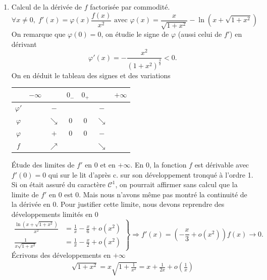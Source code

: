 \begin{enumerate}
\begin{enumerate}
  \item Calcul de la dérivée de $f$ factorisée par commodité.
\begin{displaymath}
\forall x\neq 0,\; f'(x) = \varphi(x) \frac{f(x)}{x^2} \text{ avec } 
\varphi(x) = \frac{x}{\sqrt{1+x^2}} - \ln\left( x+\sqrt{1+x^2}\right)   
\end{displaymath}
On remarque que $\varphi(0)=0$, on étudie le signe de $\varphi$ (aussi celui de $f'$) en dérivant
\begin{displaymath}
  \varphi'(x) = -\frac{x^2}{(1+x^2)^{\frac{3}{2}}} < 0 .
\end{displaymath}
On en déduit le tableau des signes et des variations
\begin{center}
\begin{tabular}{c|ccc||ccc}
           & $-\infty$ &            & $0_-$& $0_+$ &            & $+\infty$ \\ \hline
 $\varphi'$&           & $-$        &      &       & $-$        & \\ \hline
 $\varphi$ &           & $\searrow$ & $0$  & $0$   & $\searrow$ & \\ \hline
 $\varphi$ &           & $+$        & $0$  & $0$   & $-$        & \\ \hline
 $f$       &           & $\nearrow$ &      &       & $\searrow$ & 
\end{tabular}
\end{center}
\'Etude des limites de $f'$ en $0$ et en $+\infty$.\newline
En $0$, la fonction $f$ est dérivable avec $f'(0) = 0$ qui sur le lit d'après c. sur son développement tronqué à l'ordre 1. Si on était assuré du caractère $\mathcal{C}^1$, on pourrait affirmer sans calcul que la limite de $f'$ en $0$ est $0$. Mais nous n'avons même pas montré la continuité de la dérivée en $0$. Pour justifier cette limite, nous devons reprendre des développements limités en $0$
\begin{displaymath}
\left. 
\begin{aligned}
\frac{\ln\left( x + \sqrt{1+x^2}\right)}{x^2} &= \frac{1}{x} - \frac{x}{6} + o(x^2) \\
\frac{1}{x\sqrt{1+x^2}} &= \frac{1}{x} - \frac{x}{2} + o(x^2)
\end{aligned}
\right\rbrace \Rightarrow 
f'(x) = \left( -\frac{x}{3} + o(x^2)\right)f(x) \rightarrow 0. 
\end{displaymath}
\'Ecrivons des développements en $+\infty$
\begin{multline*}
\sqrt{1+x^2} =x\sqrt{1+\frac{1}{x^2}} = x+\frac{1}{2x} + o(\frac{1}{x})\\

\end{multline*}
\end{enumerate}
\end{enumerate}
